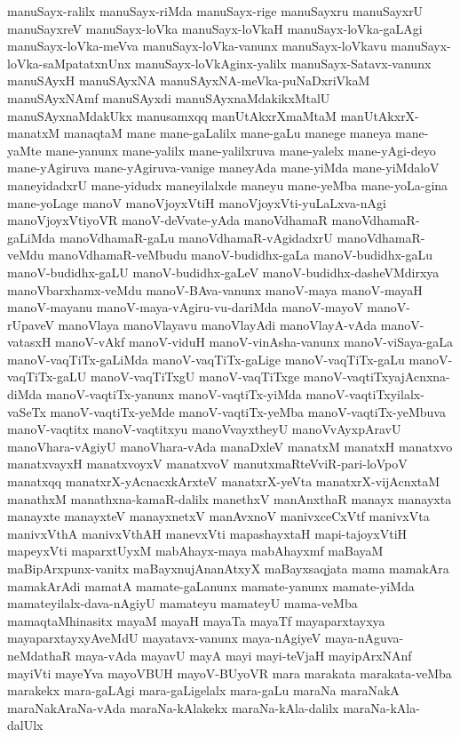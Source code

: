 {manuSayx-ralilx
manuSayx-riMda
manuSayx-rige
manuSayxru
manuSayxrU
manuSayxreV
manuSayx-loVka
manuSayx-loVkaH
manuSayx-loVka-gaLAgi
manuSayx-loVka-meVva
manuSayx-loVka-vanunx
manuSayx-loVkavu
manuSayx-loVka-saMpatatxnUnx
manuSayx-loVkAginx-yalilx
manuSayx-Satavx-vanunx
manuSAyxH
manuSAyxNA
manuSAyxNA-meVka-puNaDxriVkaM
manuSAyxNAmf
manuSAyxdi
manuSAyxnaMdakikxMtalU
manuSAyxnaMdakUkx
manusamxqq
manUtAkxrXmaMtaM
manUtAkxrX-manatxM
manaqtaM
mane
mane-gaLalilx
mane-gaLu
manege
maneya
mane-yaMte
mane-yanunx
mane-yalilx
mane-yalilxruva
mane-yalelx
mane-yAgi-deyo
mane-yAgiruva
mane-yAgiruva-vanige
maneyAda
mane-yiMda
mane-yiMdaloV
maneyidadxrU
mane-yidudx
maneyilalxde
maneyu
mane-yeMba
mane-yoLa-gina
mane-yoLage
manoV
manoVjoyxVtiH
manoVjoyxVti-yuLaLxva-nAgi
manoVjoyxVtiyoVR
manoV-deVvate-yAda
manoVdhamaR
manoVdhamaR-gaLiMda
manoVdhamaR-gaLu
manoVdhamaR-vAgidadxrU
manoVdhamaR-veMdu
manoVdhamaR-veMbudu
manoV-budidhx-gaLa
manoV-budidhx-gaLu
manoV-budidhx-gaLU
manoV-budidhx-gaLeV
manoV-budidhx-dasheVMdirxya
manoVbarxhamx-veMdu
manoV-BAva-vanunx
manoV-maya
manoV-mayaH
manoV-mayanu
manoV-maya-vAgiru-vu-dariMda
manoV-mayoV
manoV-rUpaveV
manoVlaya
manoVlayavu
manoVlayAdi
manoVlayA-vAda
manoV-vatasxH
manoV-vAkf
manoV-viduH
manoV-vinAsha-vanunx
manoV-viSaya-gaLa
manoV-vaqTiTx-gaLiMda
manoV-vaqTiTx-gaLige
manoV-vaqTiTx-gaLu
manoV-vaqTiTx-gaLU
manoV-vaqTiTxgU
manoV-vaqTiTxge
manoV-vaqtiTxyajAcnxna-diMda
manoV-vaqtiTx-yanunx
manoV-vaqtiTx-yiMda
manoV-vaqtiTxyilalx-vaSeTx
manoV-vaqtiTx-yeMde
manoV-vaqtiTx-yeMba
manoV-vaqtiTx-yeMbuva
manoV-vaqtitx
manoV-vaqtitxyu
manoVvayxtheyU
manoVvAyxpAravU
manoVhara-vAgiyU
manoVhara-vAda
manaDxleV
manatxM
manatxH
manatxvo
manatxvayxH
manatxvoyxV
manatxvoV
manutxmaRteVviR-pari-loVpoV
manatxqq
manatxrX-yAcnacxkArxteV
manatxrX-yeVta
manatxrX-vijAcnxtaM
manathxM
manathxna-kamaR-dalilx
manethxV
manAnxthaR
manayx
manayxta
manayxte
manayxteV
manayxnetxV
manAvxnoV
manivxceCxVtf
manivxVta
manivxVthA
manivxVthAH
manevxVti
mapashayxtaH
mapi-tajoyxVtiH
mapeyxVti
maparxtUyxM
mabAhayx-maya
mabAhayxmf
maBayaM
maBipArxpunx-vanitx
maBayxnujAnanAtxyX
maBayxsaqjata
mama
mamakAra
mamakArAdi
mamatA
mamate-gaLanunx
mamate-yanunx
mamate-yiMda
mamateyilalx-dava-nAgiyU
mamateyu
mamateyU
mama-veMba
mamaqtaMhinasitx
mayaM
mayaH
mayaTa
mayaTf
mayaparxtayxya
mayaparxtayxyAveMdU
mayatavx-vanunx
maya-nAgiyeV
maya-nAguva-neMdathaR
maya-vAda
mayavU
mayA
mayi
mayi-teVjaH
mayipArxNAnf
mayiVti
mayeYva
mayoVBUH
mayoV-BUyoVR
mara
marakata
marakata-veMba
marakekx
mara-gaLAgi
mara-gaLigelalx
mara-gaLu
maraNa
maraNakA
maraNakAraNa-vAda
maraNa-kAlakekx
maraNa-kAla-dalilx
maraNa-kAla-dalUlx
}
